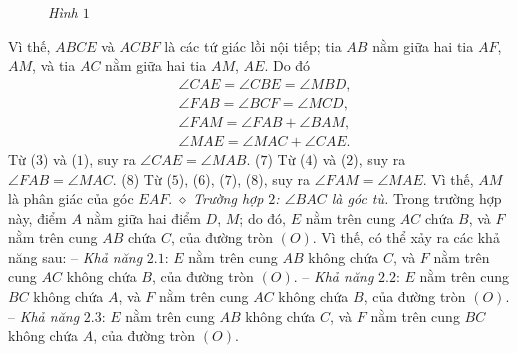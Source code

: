 \begin{multicols}{2}
\begin{figure}[H]
		\caption{\small\textit{\color{thachthuctoanhoc}Hình $1$}}
		\vspace*{-10pt}
	\end{figure}
	Vì thế, $ABCE$ và $ACBF$ là các tứ giác lồi nội tiếp; tia $AB$ nằm giữa hai tia $AF$, $AM$, và tia $AC$ nằm giữa hai tia $AM$, $AE$. Do đó
	\begin{align*}
		&\angle CAE = \angle CBE = \angle MBD, \tag{$3$}\\
		&\angle FAB = \angle BCF = \angle MCD, \tag{$4$}\\
		&\angle FAM = \angle FAB + \angle BAM,\tag{$5$}\\
		&\angle MAE = \angle MAC + \angle CAE.\tag{$6$}
	\end{align*}
	Từ ($3$) và ($1$), suy ra $\angle CAE = \angle MAB.$  \hfill ($7$)
	\vskip 0.05cm
	Từ ($4$) và ($2$), suy ra $\angle FAB = \angle MAC.$ \hfill ($8$)
	\vskip 0.05cm
	Từ ($5$), ($6$), ($7$), ($8$), suy ra $\angle FAM = \angle MAE$.  Vì thế, $AM$ là phân giác của góc $EAF$.
	\vskip 0.05cm
	$\diamond$ \textit{Trường hợp $2$: $\angle BAC$  là góc tù.}
	\vskip 0.05cm
	Trong trường hợp này, điểm $A$ nằm giữa hai điểm $D$, $M$; do đó, $E$ nằm trên cung $AC$ chứa $B$, và $F$ nằm trên cung $AB$ chứa $C$, của đường tròn $(O)$.
	\vskip 0.05cm
	Vì thế, có thể xảy ra các khả năng sau:
	\vskip 0.05cm
	-- \textit{Khả năng} $2.1$: $E$ nằm trên cung $AB$ không chứa $C$, và $F$ nằm trên cung $AC$ không chứa $B$, của đường tròn $(O)$.
	\vskip 0.05cm
	-- \textit{Khả năng} $2.2$: $E$ nằm trên cung $BC$ không chứa $A$, và $F$ nằm trên cung $AC$ không chứa $B$, của đường tròn $(O)$.
	\vskip 0.05cm
	-- \textit{Khả năng} $2.3$: $E$ nằm trên cung $AB$ không chứa $C$, và $F$ nằm trên cung $BC$ không chứa $A$, của đường tròn $(O)$.

\end{multicols}
